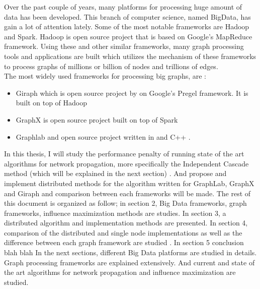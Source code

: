 \documentclass[english]{tktltiki}
\begin{document}
Over the past couple of years, many platforms for processing huge amount of data has been developed. This branch of computer science, named BigData, has gain a lot of attention lately. Some of the most notable frameworks are Hadoop and Spark. Hadoop is open source project that is based on Google's MapReduce framework. 
Using these and other similar frameworks, many graph processing tools and applications are built which utilizes the mechanism of these frameworks to process graphs of millions or billion of nodes and trillions of edges. \\
The most widely used frameworks for processing big graphs, are :
\begin{itemize}
\item 
Giraph which is open source project by on Google's Pregel framework. It is built on top of Hadoop
\item 
GraphX is open source project built on top of Spark
\item
Graphlab and open source project written in  and C++ . 
\end{itemize}

In this thesis, I will study the performance penalty of running state of the art algorithms for network propagation, more specifically the Independent Cascade method (which will be explained in the next section) . And propose and implement distributed methods for the algorithm written for GraphLab, GraphX and Giraph and comparison between each frameworks will be made. 
The rest of this document is organized as follow; in section 2, Big Data frameworks, graph frameworks, influence maximization methods are studies. In section 3, a distributed algorithm and implementation methods are presented. In section 4, comparison of the distributed and single node implementations as well as the difference between each graph framework are studied . In section 5 conclusion blah blah
In the next sections, different Big Data platforms are studied in details. Graph processing frameworks are explained extensively. And current and state of the art algorithms for network propagation and influence maximization are studied. 

\newpage
\end{document}
